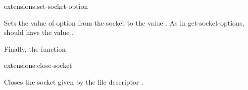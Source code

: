 \begin{defun}{extensions:}{set-socket-option}{%
    }
  
  Sets the value of option  from the socket 
  to the value . As in get-socket-options, 
  should have the value .

\end{defun}

Finally, the function

\begin{defun}{extensions:}{close-socket}{%
    }

  Closes the socket given by the file descriptor .

\end{defun}

